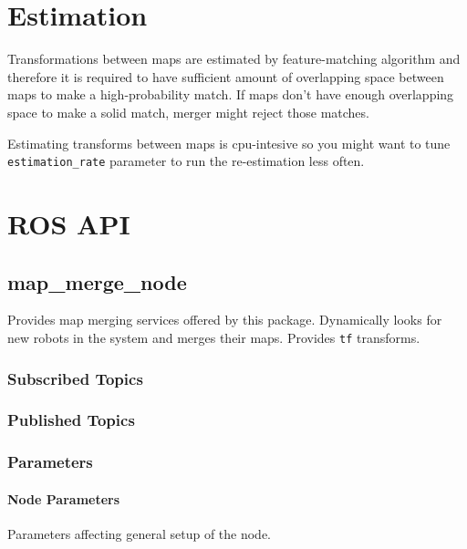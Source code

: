 \section{Estimation}

Transformations between maps are estimated by feature-matching algorithm and therefore it is required to have sufficient amount of overlapping space between maps to make a high-probability match. If maps don't have enough overlapping space to make a solid match, merger might reject those matches.

Estimating transforms between maps is cpu-intesive so you might want to tune \texttt{estimation\_rate} parameter to run the re-estimation less often.

\section{ROS API}

\subsection{map\_merge\_node}

Provides map merging services offered by this package. Dynamically looks for new robots in the system and merges their maps. Provides \texttt{tf} transforms.

\subsubsection{Subscribed Topics}


\subsubsection{Published Topics}


\subsubsection{Parameters}
\paragraph{Node Parameters}

Parameters affecting general setup of the node.

